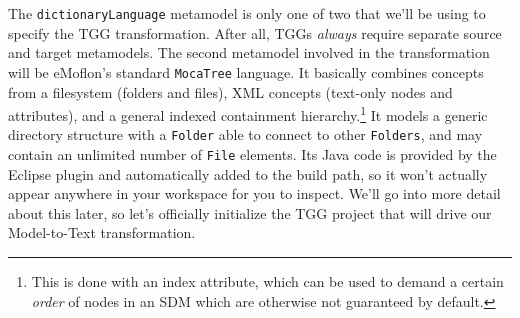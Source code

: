 The \texttt{dictionaryLanguage} metamodel is only one of two that we'll be using to specify the TGG transformation. After all, TGGs \emph{always} require
separate source and target metamodels. The second metamodel involved in the transformation will be eMoflon's standard \texttt{MocaTree} language. It basically
combines concepts from a filesystem (folders and files), XML concepts (text-only nodes and attributes), and a general indexed containment
hierarchy.\footnote{This is done with an index attribute, which can be used to demand a certain \emph{order} of nodes in an SDM which are otherwise not
guaranteed by default.} It models a generic directory structure with a \texttt{Folder} able to connect to other \texttt{Folders}, and may contain an unlimited
number of \texttt{File} elements. Its Java code is provided by the Eclipse plugin and automatically added to the build path, so it won't actually appear
anywhere in your workspace for you to inspect.  We'll go into more detail about this later, so let's officially initialize the TGG project that will drive our
Model-to-Text transformation.







